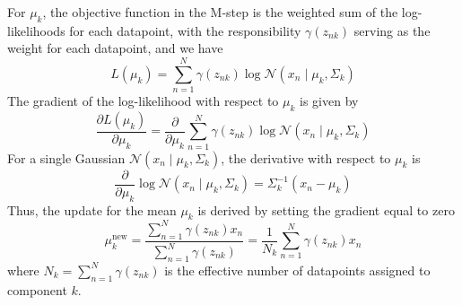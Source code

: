 For \(\mu_k\), the objective function in the M-step is the weighted sum of the log-likelihoods for each datapoint, with the responsibility \(\gamma(z_{n k})\) serving as the weight for each datapoint, and we have
\[
    L(\mu_k) = \sum_{n=1}^N \gamma(z_{n k}) \log \mathcal{N}(x_n \mid \mu_k, \Sigma_k)
\]
The gradient of the log-likelihood with respect to \(\mu_k\) is given by
\[
    \frac{\partial L(\mu_k)}{\partial \mu_k}
    =
    \frac{\partial}{\partial \mu_k} \sum_{n=1}^N \gamma(z_{n k}) \log \mathcal{N}(x_n \mid \mu_k, \Sigma_k)
\]
For a single Gaussian \(\mathcal{N}(x_n \mid \mu_k, \Sigma_k)\), the derivative with respect to \(\mu_k\) is
\[
    \frac{\partial}{\partial \mu_k} \log \mathcal{N}(x_n \mid \mu_k, \Sigma_k) = \Sigma_k^{-1}(x_n - \mu_k)
\]
Thus, the update for the mean \(\mu_k\) is derived by setting the gradient equal to zero
\[
    \mu_k^{\text{new}} = \frac{\sum_{n=1}^N \gamma(z_{n k}) x_n}{\sum_{n=1}^N \gamma(z_{n k})} = \frac{1}{N_k} \sum_{n=1}^N \gamma(z_{n k}) x_n
\]
where \(N_k = \sum_{n=1}^N \gamma(z_{n k})\) is the effective number of datapoints assigned to component \(k\).
